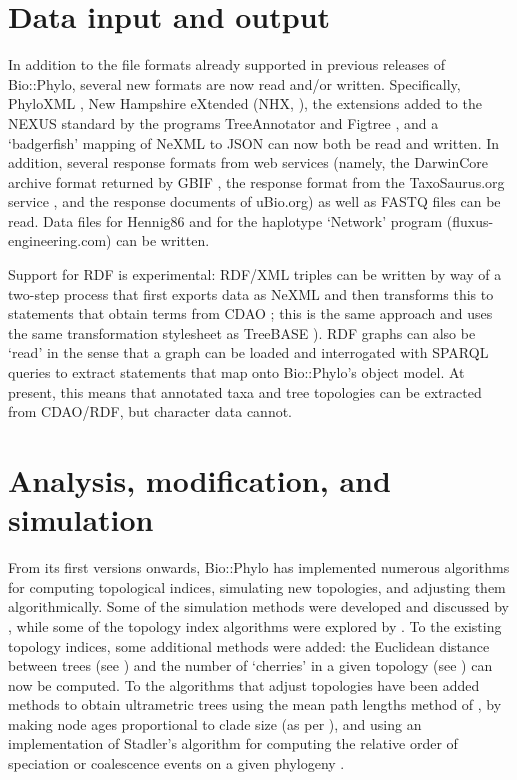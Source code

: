 \documentclass{bioinfo}
\begin{document}
\section{Data input and output}

In addition to the file formats already supported in previous releases of Bio::Phylo, 
several new formats are now read and/or written. Specifically, PhyloXML \citep{Han2009},
New Hampshire eXtended (NHX, \citet{Zmasek2001}), the extensions added to the NEXUS
standard by the programs TreeAnnotator and Figtree \citep{Rambaut2007}, and a `badgerfish'
mapping of NeXML \citep{Vos2012} to JSON can now both be read and written. In addition, 
several response formats from web services (namely, the DarwinCore archive format returned 
by GBIF \citep{Baker2014}, the response format from the TaxoSaurus.org service 
\citep{Stoltzfus2013}, and the response documents of uBio.org) as well as FASTQ 
\citep{Cock2009} files can be read. Data files for Hennig86 \citep{Farris1988} and for
the haplotype `Network' program (fluxus-engineering.com) can be written. 

Support for RDF is experimental: RDF/XML triples can be written by way of a two-step 
process that first exports data as NeXML and then transforms this to statements that 
obtain terms from CDAO \citep{Prosdocimi2009}; this is the same approach and uses the 
same transformation stylesheet as TreeBASE \citep{Piel2009}). RDF graphs can also be 
`read' in the sense that a graph can be loaded and interrogated with SPARQL queries to 
extract statements that map onto Bio::Phylo's object model. At present, this means that 
annotated taxa and tree topologies can be extracted from CDAO/RDF, but character data 
cannot.

\section{Analysis, modification, and simulation}

From its first versions onwards, Bio::Phylo has implemented numerous algorithms for 
computing topological indices, simulating new topologies, and adjusting them 
algorithmically. Some of the simulation methods were developed and discussed by 
\citet{Hartmann2010}, while some of the topology index algorithms were explored by
\citet{Martyn2012}. To the existing topology indices, some additional methods were added: 
the Euclidean distance between trees (see \citet{Kuhner1994}) and the number of `cherries'
in a given topology (see \citet{McKenzie2000}) can now be computed. To the algorithms
that adjust topologies have been added methods to obtain ultrametric trees using the mean 
path lengths method of \citet{Britton2002}, by making node ages proportional to clade size 
(as per \citet{Grafen1989}), and using an implementation of Stadler's algorithm for 
computing the relative order of speciation or coalescence events on a given phylogeny 
\citep{Gernhard2006}.
\end{document}
